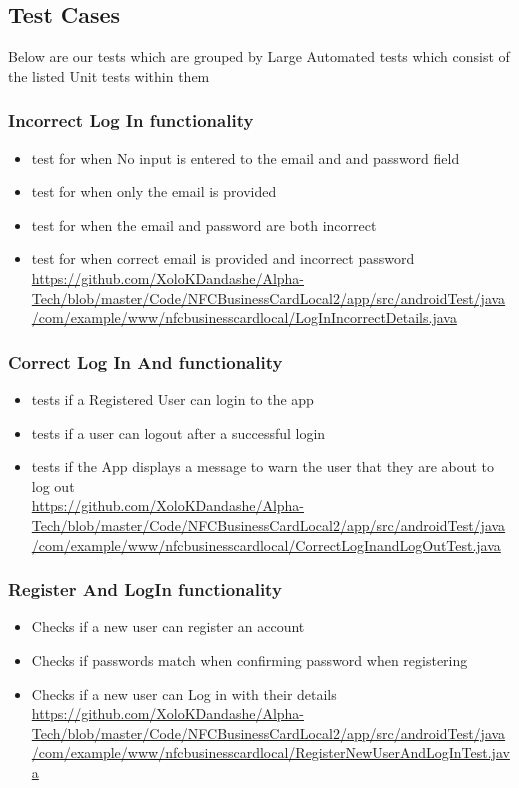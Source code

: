 \documentclass[english]{article}
\begin{document}
	\subsection {Test Cases}
	Below are our tests which are grouped by Large Automated tests which consist of the listed Unit tests within them
		\subsubsection{Incorrect Log In functionality}
		\begin{itemize} 
			\item test for when No input is entered to the email and and password field
			\item test for when only the email is provided 
			\item test for when the email and password  are both incorrect
			\item test for when correct email is provided and incorrect password
			\\
			\href{url}{https://github.com/XoloKDandashe/Alpha-Tech/blob/master/Code/NFCBusinessCardLocal2/app/src/androidTest/java/com/example/www/nfcbusinesscardlocal/LogInIncorrectDetails.java}

		\end{itemize}
		\subsubsection{Correct Log In And functionality}
		\begin{itemize} 
			\item tests if a Registered User can login to the app
			\item tests if a user can logout after a successful login
			\item tests if the App displays a message to warn the user that they are about to log out
			\\
			\href{url}{https://github.com/XoloKDandashe/Alpha-Tech/blob/master/Code/NFCBusinessCardLocal2/app/src/androidTest/java/com/example/www/nfcbusinesscardlocal/CorrectLogInandLogOutTest.java}
		\end{itemize}

		\subsubsection{Register And LogIn functionality}
		\begin{itemize} 
			\item Checks if a new user can register an account
			\item Checks if passwords match when confirming password when registering
			\item Checks if a new user can Log in with their details 
			\\
	\href{url}{https://github.com/XoloKDandashe/Alpha-Tech/blob/master/Code/NFCBusinessCardLocal2/app/src/androidTest/java/com/example/www/nfcbusinesscardlocal/RegisterNewUserAndLogInTest.java}

			
		\end{itemize}
\end{document}
